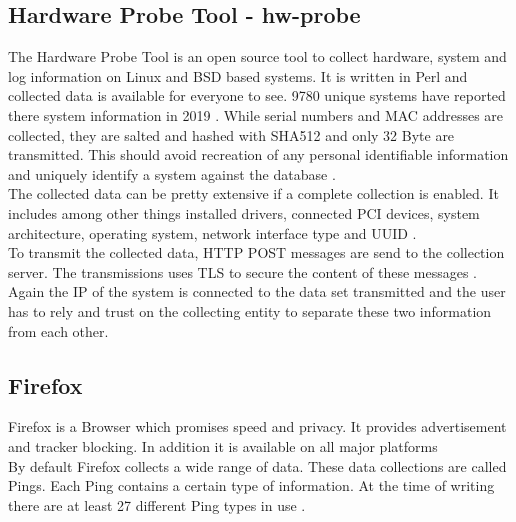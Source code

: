     \subsection{Hardware Probe Tool - hw-probe}
        The Hardware Probe Tool is an open source tool to collect hardware, system and log information on Linux and BSD based systems. It is written in Perl and collected data is available for everyone to see. 9780 unique systems have reported there system information in 2019 \cite{ponomarenko_linux_nodate}.
        While serial numbers and MAC addresses are collected, they are salted and hashed with SHA512 and only 32 Byte are transmitted. 
        This should avoid recreation of any personal identifiable information and uniquely identify a system against the database  \cite{project_linuxhwhw-probe_2020}.\\
        The collected data can be pretty extensive if a complete collection is enabled. It includes among other things installed drivers, connected PCI devices, system architecture, operating system, network interface type and UUID \cite{project_linuxhwhw-probe_2020}.\\
        
        To transmit the collected data, HTTP POST messages are send to the collection server. The transmissions uses TLS to secure the content of these messages \cite{project_linuxhwhw-probe_2020}.\\
        Again the IP of the system is connected to the data set transmitted and the user has to rely and trust on the collecting entity to separate these two information from each other.\\
    


\newpage
    \subsection{Firefox}
        Firefox is a Browser which promises speed and privacy. It provides advertisement and tracker blocking. In addition it is available on all major platforms\\ 
        By default Firefox collects a wide range of data. These data collections are called Pings. Each Ping contains a certain type of information. At the time of writing there are at least 27 different Ping types in use \cite{mozilla_telemetry_nodate}.
        
